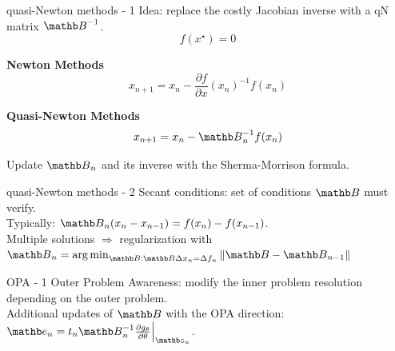 \begin{frame}{quasi-Newton methods - 1}
    Idea: replace the costly Jacobian inverse with a qN matrix $\Bb^{-1}$.\\
    \begin{equation*}
        f(x^\star) = 0
    \end{equation*}
    \begin{multicols}{2}

            \begin{center}
                \textbf{Newton Methods}
                \begin{equation*}
                    x_{n+1} = x_n -\frac{\partial f}{\partial x}(x_n)^{-1}f(x_n)
                \end{equation*}
            \end{center}
            \newpage
            \begin{center}
                \textbf{Quasi-Newton Methods}
                \begin{equation*}
                    x_{n+1} = x_n -\Bb_n^{-1}f(x_n)
                \end{equation*}
            \end{center}
            Update $\Bb_n$ and its inverse with the Sherma-Morrison formula.
    \end{multicols}
\end{frame}

\begin{frame}{quasi-Newton methods - 2}
    Secant conditions: set of conditions $\Bb$ must verify.\\
    Typically: $\Bb_n(x_n - x_{n-1}) = f(x_n) - f(x_{n-1})$.\\
    Multiple solutions $\Rightarrow$ regularization with $\Bb_n = \argmin_{\Bb: \Bb \Delta x_n = \Delta f_n} \|\Bb - \Bb_{n-1}\|$
\end{frame}

\begin{frame}{OPA - 1}
    Outer Problem Awareness: modify the inner problem resolution depending on the outer problem.\\

    Additional updates of $\Bb$ with the OPA direction: $\eb_n = t_n \Bb_n^{-1} \frac{\partial g_{\theta}}{\partial \theta}\Bigr|_{\zb_n}$.
\end{frame}

